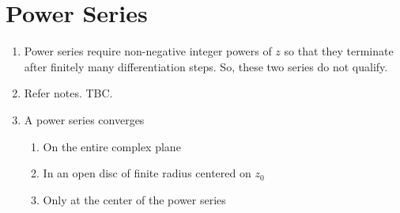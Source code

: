 \section{Power Series}

\begin{enumerate}
    \item Power series require non-negative integer powers of $ z $ so that they terminate
          after finitely many differentiation steps. So, these two series do not qualify.

    \item Refer notes. TBC.

    \item A power series converges
          \begin{enumerate}
              \item On the entire complex plane
              \item In an open disc of finite radius centered on $ z_0 $
              \item Only at the center of the power series
          \end{enumerate}


\end{enumerate}
